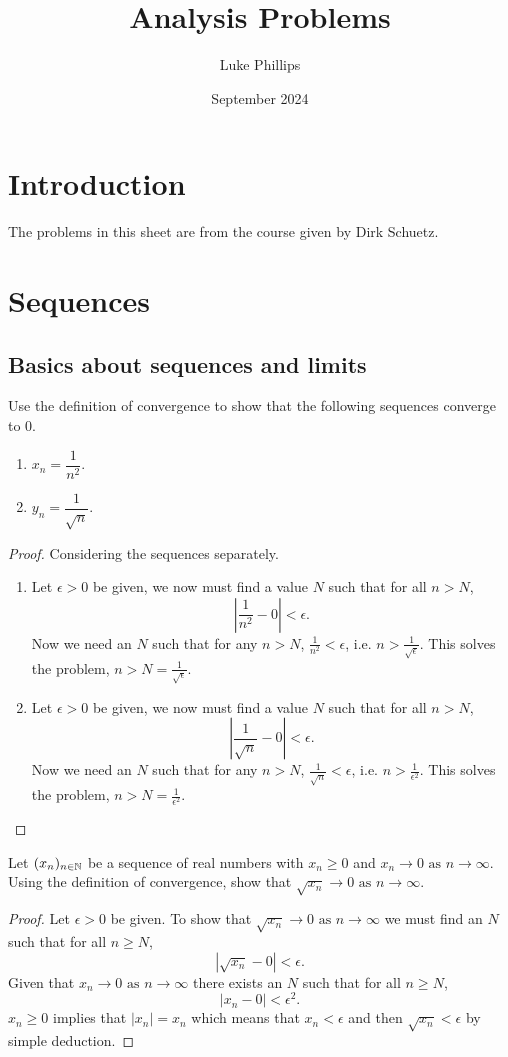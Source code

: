 \documentclass[10pt, a4paper]{article}
\title{Analysis Problems}
\author{Luke Phillips}
\date{September 2024}
\newcommand{\limas}[3][n]{#2 \rightarrow #3 \text{ as } #1 \rightarrow \infty}
\begin{document}
\section{Introduction}
The problems in this sheet are from the course given by Dirk Schuetz.

\section{Sequences}

\subsection{Basics about sequences and limits}

\begin{example}
    Use the definition of convergence to show that the following sequences converge to $0$.
    \begin{enumerate}[label = \alph*.]
        \item $x_n = \dfrac{1}{n ^ 2}$.
        \item $y_n = \dfrac{1}{\sqrt{n}}$.
    \end{enumerate}
    \begin{proof}
    Considering the sequences separately.
    \begin{enumerate}[label = \alph*.]
    \item
        Let $\epsilon > 0$ be given, we now must find a value $N$ such that for all $n > N$,
        \[
        \left|\frac{1}{n ^ 2} - 0\right| < \epsilon.
        \]
        Now we need an $N$ such that for any $n > N$, $\frac{1}{n ^ 2} < \epsilon$, i.e. $n > \frac{1}{\sqrt{\epsilon}}$. This solves the problem, $n > N = \frac{1}{\sqrt{\epsilon}}$.
    \item
        Let $\epsilon > 0$ be given, we now must find a value $N$ such that for all $n > N$,
        \[
        \left|\frac{1}{\sqrt{n}} - 0\right| < \epsilon.
        \]
        Now we need an $N$ such that for any $n > N$, $\frac{1}{\sqrt{n}} < \epsilon$, i.e. $n > \frac{1}{\epsilon ^ 2}$. This solves the problem, $n > N = \frac{1}{\epsilon ^ 2}$.
    \end{enumerate}
    \end{proof}
\end{example}

\begin{example}
    Let $(x_n)_{n \in \mathbb{N}}$ be a sequence of real numbers with $x_n \geq 0$ and $\limas{x_n}{0}$. Using the definition of convergence, show that $\limas{\sqrt{x_n}}{0}$.
    \begin{proof}
        Let $\epsilon > 0$ be given. To show that $\limas{\sqrt{x_n}}{0}$ we must find an $N$ such that for all $n \geq N$,
        \[
        |\sqrt{x_n} - 0| < \epsilon.
        \]
        Given that $\limas{x_n}{0}$ there exists an $N$ such that for all $n \geq N$,
        \[
        |x_n - 0| < \epsilon ^ 2.
        \]
        $x_n \geq 0$ implies that $|x_n| = x_n$ which means that $x_n < \epsilon$ and then $\sqrt{x_n} < \epsilon$ by simple deduction.
    \end{proof}
\end{example}
\end{document}
